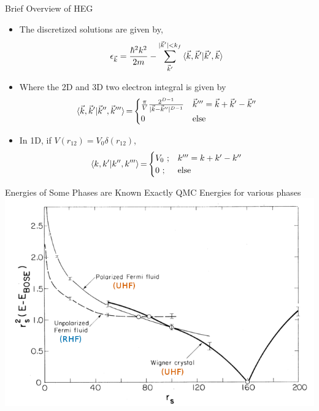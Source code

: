 \documentclass[10pt]{beamer}
\begin{document}
{{{{{{{{\begin{frame}{Brief Overview of HEG}
	\begin{itemize}[<+->]
		\item{The discretized solutions are given by,
		\begin{eqnarray}\label{eq:hf_orb_energy}
			\epsilon_{\vec{k}}=
				\frac{\hbar^2 k^2}{2m} - \sum\limits_{\vec{k}'}^{|\vec{k}'|< k_f}
				\braket{\vec{k}, \vec{k}' |\vec{k}', \vec{k}}
		\end{eqnarray}
		}
		\item{Where the 2D and 3D two electron integral is given by
  		\begin{equation}
  			\braket{\vec{k}, \vec{k}'|\vec{k}'',\vec{k}'''}{=}
  				\begin{cases}
  				\frac{\pi}{V}\frac{2^{D-1}}{|\vec{k}-\vec{k}''|^{D-1}}
  				& \vec{k}''' = \vec{k}+\vec{k}'-\vec{k}'' \nonumber\\
  				0
  				& \text{else}
  				\end{cases}
  		\end{equation}
		}
		\item{ In 1D, if $V(r_{12}) = V_0\delta{(r_{12})}$,
		  \begin{equation}
  			\braket{k, k'|k'',k'''}{=}
  				\begin{cases}
  				V_0\text{ ;}
  				& k''' = k+k'-k'' \\
  				0\text{ ;}
  				& \text{else}
  				\end{cases}
		  \end{equation}
		}
	\end{itemize}
\end{frame}

{%

\begin{frame}{Energies of Some Phases are Known Exactly}
  \centering
	QMC Energies for various phases
	\includegraphics[width=.85\linewidth]{../figures/Ceperley_PhaseDiag_labels.png}
\end{frame}

}}}}}}}}}
\end{document}
